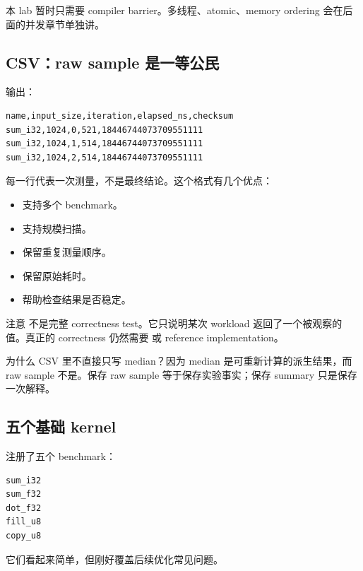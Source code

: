 本 lab 暂时只需要 compiler barrier。多线程、atomic、memory ordering 会在后面的并发章节单独讲。

\subsection{CSV：raw sample 是一等公民}

 输出：

\begin{lstlisting}
name,input_size,iteration,elapsed_ns,checksum
sum_i32,1024,0,521,18446744073709551111
sum_i32,1024,1,514,18446744073709551111
sum_i32,1024,2,514,18446744073709551111
\end{lstlisting}

每一行代表一次测量，不是最终结论。这个格式有几个优点：

\begin{itemize}
  \item {} 支持多个 benchmark。
  \item {} 支持规模扫描。
  \item {} 保留重复测量顺序。
  \item {} 保留原始耗时。
  \item {} 帮助检查结果是否稳定。
\end{itemize}

注意  不是完整 correctness test。它只说明某次 workload 返回了一个被观察的值。真正的 correctness 仍然需要  或 reference implementation。

\begin{deepdive}
为什么 CSV 里不直接只写 median？因为 median 是可重新计算的派生结果，而 raw sample 不是。保存 raw sample 等于保存实验事实；保存 summary 只是保存一次解释。
\end{deepdive}

\subsection{五个基础 kernel}

 注册了五个 benchmark：

\begin{lstlisting}
sum_i32
sum_f32
dot_f32
fill_u8
copy_u8
\end{lstlisting}

它们看起来简单，但刚好覆盖后续优化常见问题。

